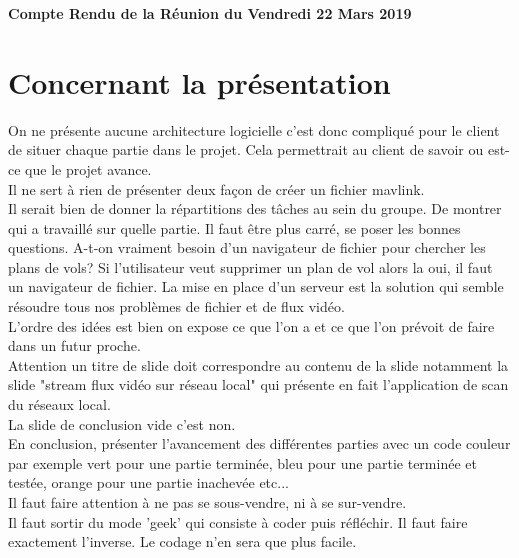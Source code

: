 \documentclass[]{article}
\begin{document}
\pagestyle{fancy}
\renewcommand\headrulewidth{1pt}
\renewcommand\footrulewidth{1pt}

\begin{center}
\large{\textbf{Compte Rendu de la Réunion du Vendredi 22 Mars 2019 \bigbreak}}
\end{center}

\section{Concernant la présentation}
\indent On ne présente aucune architecture logicielle c'est donc compliqué pour le client de situer chaque partie dans le projet. Cela permettrait au client de savoir ou est-ce que le projet avance.\\
Il ne sert à rien de présenter deux façon de créer un fichier mavlink.\\
Il serait bien de donner la répartitions des tâches au sein du groupe. De montrer qui a travaillé sur quelle partie. Il faut être plus carré, se poser les bonnes questions. A-t-on vraiment besoin d'un navigateur de fichier pour chercher les plans de vols? Si l'utilisateur veut supprimer un plan de vol alors la oui, il faut un navigateur de fichier. La mise en place d'un serveur est la solution qui semble résoudre tous nos problèmes de fichier et de flux vidéo.\\
L'ordre des idées est bien on expose ce que l'on a et ce que l'on prévoit de faire dans un futur proche.\\
Attention un titre de slide doit correspondre au contenu de la slide notamment la slide "stream flux vidéo sur réseau local" qui présente en fait l'application de scan du réseaux local. \\
La slide de conclusion vide c'est non.\\ En conclusion, présenter l'avancement des différentes parties avec un code couleur par exemple vert pour une partie terminée, bleu pour une partie terminée et testée, orange pour une partie inachevée etc...\\
Il faut faire attention à ne pas se sous-vendre, ni à se sur-vendre.\\
Il faut sortir du mode 'geek' qui consiste à coder puis réfléchir. Il faut faire exactement l'inverse. Le codage n'en sera que plus facile.\\
\end{document}
